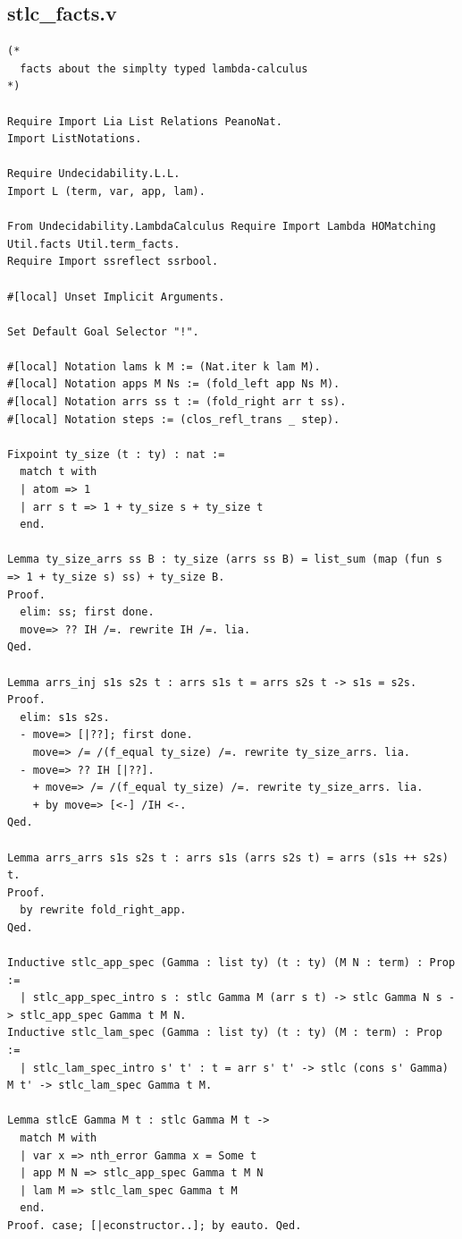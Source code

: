 \subsection*{stlc\_facts.v}
\begin{lstlisting}
(*
  facts about the simplty typed lambda-calculus
*)

Require Import Lia List Relations PeanoNat.
Import ListNotations.

Require Undecidability.L.L.
Import L (term, var, app, lam).

From Undecidability.LambdaCalculus Require Import Lambda HOMatching Util.facts Util.term_facts.
Require Import ssreflect ssrbool.

#[local] Unset Implicit Arguments.

Set Default Goal Selector "!".

#[local] Notation lams k M := (Nat.iter k lam M).
#[local] Notation apps M Ns := (fold_left app Ns M).
#[local] Notation arrs ss t := (fold_right arr t ss).
#[local] Notation steps := (clos_refl_trans _ step).

Fixpoint ty_size (t : ty) : nat :=
  match t with
  | atom => 1
  | arr s t => 1 + ty_size s + ty_size t
  end.

Lemma ty_size_arrs ss B : ty_size (arrs ss B) = list_sum (map (fun s => 1 + ty_size s) ss) + ty_size B.
Proof.
  elim: ss; first done.
  move=> ?? IH /=. rewrite IH /=. lia.
Qed.

Lemma arrs_inj s1s s2s t : arrs s1s t = arrs s2s t -> s1s = s2s.
Proof.
  elim: s1s s2s.
  - move=> [|??]; first done.
    move=> /= /(f_equal ty_size) /=. rewrite ty_size_arrs. lia.
  - move=> ?? IH [|??].
    + move=> /= /(f_equal ty_size) /=. rewrite ty_size_arrs. lia.
    + by move=> [<-] /IH <-.
Qed.

Lemma arrs_arrs s1s s2s t : arrs s1s (arrs s2s t) = arrs (s1s ++ s2s) t.
Proof.
  by rewrite fold_right_app.
Qed.

Inductive stlc_app_spec (Gamma : list ty) (t : ty) (M N : term) : Prop :=
  | stlc_app_spec_intro s : stlc Gamma M (arr s t) -> stlc Gamma N s -> stlc_app_spec Gamma t M N.
Inductive stlc_lam_spec (Gamma : list ty) (t : ty) (M : term) : Prop :=
  | stlc_lam_spec_intro s' t' : t = arr s' t' -> stlc (cons s' Gamma) M t' -> stlc_lam_spec Gamma t M.

Lemma stlcE Gamma M t : stlc Gamma M t ->
  match M with
  | var x => nth_error Gamma x = Some t
  | app M N => stlc_app_spec Gamma t M N
  | lam M => stlc_lam_spec Gamma t M
  end.
Proof. case; [|econstructor..]; by eauto. Qed.


\end{lstlisting}
